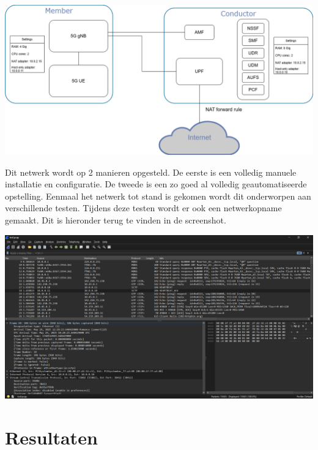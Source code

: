 \documentclass[a0,portrait]{hogent-poster}
\begin{document}
\begin{multicols}{2}
\begin{center}
  \captionsetup{type=figure}
  \includegraphics[width=1.0\linewidth]{./graphics/POC-setup.png}
\end{center}

Dit netwerk wordt op 2 manieren opgesteld. De eerste is een volledig manuele installatie en configuratie. De tweede is een zo goed al volledig geautomatiseerde opstelling. 
Eenmaal het netwerk tot stand is gekomen wordt dit onderworpen aan verschillende testen. Tijdens deze testen wordt er ook een netwerkopname gemaakt. Dit is hieronder terug te vinden in de screenshot.

\begin{center}
  \captionsetup{type=figure}
  \includegraphics[width=1.0\linewidth]{./graphics/POC-wireshark.png}
\end{center}


\section{Resultaten}


\end{multicols}
\end{document}
